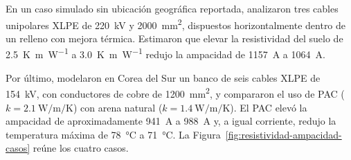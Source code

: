 \documentclass[11pt,a4paper,oneside]{report}
\begin{document}
En un caso simulado sin ubicación geográfica reportada, \textcite[15--16]{atoccsa2024} analizaron tres cables unipolares XLPE de \SI{220}{\kilo\volt} y \SI{2000}{\milli\metre\squared}, dispuestos horizontalmente dentro de un relleno con mejora térmica. Estimaron que elevar la resistividad del suelo de \SI{2.5}{\kelvin\metre\per\watt} a \SI{3.0}{\kelvin\metre\per\watt} redujo la ampacidad de \SI{1157}{\ampere} a \SI{1064}{\ampere}. 

Por último, \textcite[12--16]{kim2025} modelaron en Corea del Sur un banco de seis cables XLPE de \SI{154}{\kilo\volt}, con conductores de cobre de \SI{1200}{\milli\metre\squared}, y compararon el uso de PAC ($k=\SI{2.1}{\watt\per\metre\per\kelvin}$) con arena natural ($k=\SI{1.4}{\watt\per\metre\per\kelvin}$). El PAC elevó la ampacidad de aproximadamente \SI{941}{\ampere} a \SI{988}{\ampere} y, a igual corriente, redujo la temperatura máxima de \SI{78}{\celsius} a \SI{71}{\celsius}. La Figura~\ref{fig:resistividad-ampacidad-casos} reúne los cuatro casos.
\end{document}
